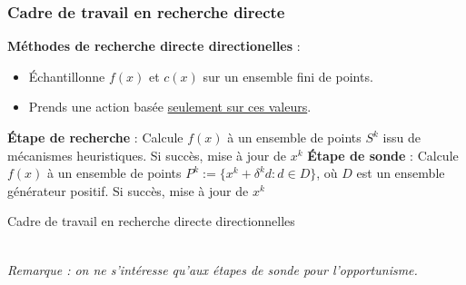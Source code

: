 \documentclass{beamer}
\begin{document}
\begin{frame}%
\frametitle{Cadre de travail en recherche directe}
\textbf{Méthodes de recherche directe directionelles} :
\begin{itemize}
	\pause
	\item Échantillonne $f(x)$ et $c(x)$ sur un ensemble fini de points.
	\pause
	\item Prends une action basée \underline{seulement sur ces valeurs}.
\end{itemize}
\pause
\setcounter{algorithm}{0}
\begin{minipage}{0.7\linewidth}
\begin{algorithm}[H]
	\scriptsize
	\begin{algorithmic}[]
		\STATE \textbf{Étape de recherche} : Calcule $f(x)$ à un ensemble de points $S^k$ issu de mécanismes heuristiques.
		\STATE Si succès, mise à jour de $x^k$
		\STATE
		\STATE \textbf{Étape de sonde} : Calcule $f(x)$ à un ensemble de points 
		\STATE $P^k:=\{x^k+\delta ^k d:d\in D\}$, où $D$ est un ensemble générateur positif. 
		\STATE Si succès, mise à jour de $x^k$
		\ENDFOR
	\end{algorithmic}
	\caption{Cadre de travail en recherche directe directionnelles}
	\label{alg:seq}
\end{algorithm}
\end{minipage}\\
\pause
\textit{Remarque : on ne s'intéresse qu'aux étapes de sonde pour l'opportunisme.}
\end{frame}
\end{document}
